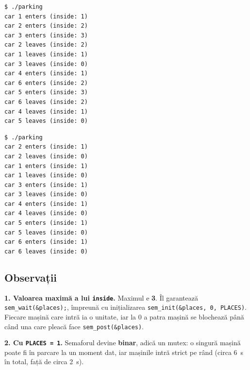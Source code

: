 \documentclass[11pt,a4paper]{article}
\begin{document}
\begin{terminal}[Rulare (PLACES = 3)]
\begin{verbatim}
$ ./parking
car 1 enters (inside: 1)
car 2 enters (inside: 2)
car 3 enters (inside: 3)
car 2 leaves (inside: 2)
car 1 leaves (inside: 1)
car 3 leaves (inside: 0)
car 4 enters (inside: 1)
car 6 enters (inside: 2)
car 5 enters (inside: 3)
car 6 leaves (inside: 2)
car 4 leaves (inside: 1)
car 5 leaves (inside: 0)
\end{verbatim}
\end{terminal}

\begin{terminal}[Rulare cu PLACES = 1]
\begin{verbatim}
$ ./parking
car 2 enters (inside: 1)
car 2 leaves (inside: 0)
car 1 enters (inside: 1)
car 1 leaves (inside: 0)
car 3 enters (inside: 1)
car 3 leaves (inside: 0)
car 4 enters (inside: 1)
car 4 leaves (inside: 0)
car 5 enters (inside: 1)
car 5 leaves (inside: 0)
car 6 enters (inside: 1)
car 6 leaves (inside: 0)
\end{verbatim}
\end{terminal}

\subsection*{Observații}
\begin{answer}
\textbf{1. Valoarea maximă a lui \texttt{inside}.} Maximul e \textbf{3}. Îl garantează \texttt{sem\_wait(\&places);},
împreună cu inițializarea \texttt{sem\_init(\&places, 0, PLACES)}. Fiecare mașină care intră ia o unitate, iar la 0 a
patra mașină se blochează până când una care pleacă face \texttt{sem\_post(\&places)}.

\medskip
\textbf{2. Cu \texttt{PLACES = 1}.} Semaforul devine \textbf{binar}, adică un mutex: o singură mașină poate fi în
parcare la un moment dat, iar mașinile intră strict pe rând (circa 6~s în total, față de circa 2~s).
\end{answer}

\end{document}
